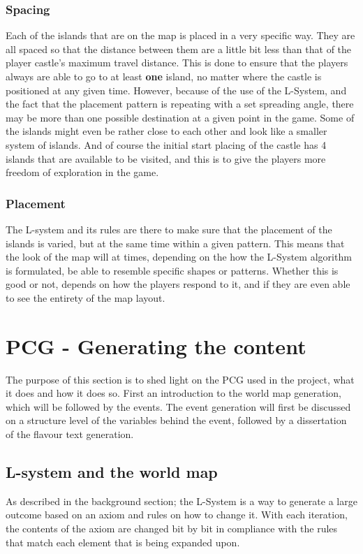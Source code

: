 \subsubsection{Spacing}
Each of the islands that are on the map is placed in a very specific way. They are all spaced so that the distance between them are a little bit less than that of the player castle's maximum travel distance. This is done to ensure that the players always are able to go to at least \textbf{one} island, no matter where the castle is positioned at any given time. However, because of the use of the L-System, and the fact that the placement pattern is repeating with a set spreading angle, there may be more than one possible destination at a given point in the game. Some of the islands might even be rather close to each other and look like a smaller system of islands. And of course the initial start placing of the castle has 4 islands that are available to be visited, and this is to give the players more freedom of exploration in the game.

\subsubsection{Placement}
The L-system and its rules are there to make sure that the placement of the islands is varied, but at the same time within a given pattern. This means that the look of the map will at times, depending on the how the L-System algorithm is formulated, be able to resemble specific shapes or patterns. Whether this is good or not, depends on how the players respond to it, and if they are even able to see the entirety of the map layout.

\section{PCG - Generating the content}
The purpose of this section is to shed light on the PCG used in the project, what it does and how it does so. First an introduction to the world map generation, which will be followed by the events.
The event generation will first be discussed on a structure level of the variables behind the event, followed by a dissertation of the flavour text generation.

\subsection{L-system and the world map}
\label{sec:lsys}
As described in the background section; the L-System is a way to generate a large outcome based on an axiom and rules on how to change it. With each iteration, the contents of the axiom are changed bit by bit in compliance with the rules that match each element that is being expanded upon.

